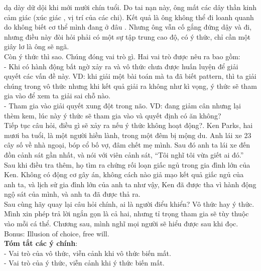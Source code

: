\documentclass{article}
\newcommand\tab[1][1cm]{\hspace*{#1}}
\begin{document}
dạ dày dữ dội khi mới mười chín tuổi. Do tai nạn này, ông mất các dây thần kinh cảm giác (xúc giác
, vị trí của các chi). Kết quả là ông không thể đi loanh quanh do không biết cơ thể mình đang ở đâu
. Nhưng ông vẫn cố gắng đứng dậy và đi, nhưng điều này đòi hỏi phải có một sự tập trung cao độ, 
có ý thức, chỉ cần một giây lơ là ông sẽ ngã.\\
\tab Còn ý thức thì sao. Chúng đóng vai trò gì. Hai vai trò được nêu ra bao gồm:\\
\tab - Khi có hành động bất ngờ xảy ra và vô thức chưa được huấn luyện để giải quyết các vấn đề này.
VD: khi giải một bài toán mà ta đã biết pattern, thì ta giải chúng trong vô thức nhưng khi kết quả 
giải ra không như kì vọng, ý thức sẽ tham gia vào để xem ta giải sai chỗ nào.\\
\tab - Tham gia vào giải quyết xung đột trong não. VD: đang giảm cân nhưng lại thèm kem, lúc này ý
thức sẽ tham gia vào và quyết định có ăn không?\\
\tab Tiếp tục câu hỏi, điều gì sẽ xảy ra nếu ý thức không hoạt động?. Ken Parks, hai mươi ba tuổi, 
là một người hiền lành, trong một đêm bị mộng du. Anh lái xe 23 cây số về nhà ngoại, bóp cổ bố vợ,
đâm chết mẹ mình. Sau đó anh ta lái xe đến đồn cảnh sát gần nhất, và nói với viên cảnh sát, “Tôi nghĩ tôi
vừa giết ai đó.” Sau khi điều tra thêm, họ tìm ra chứng rối loạn giấc ngủ trong gia đình lớn của Ken. 
Không có động cơ gây án, không cách nào giả mạo kết quả giấc ngủ của anh ta, và lịch sử gia đình lớn của 
anh ta như vậy, Ken đã được tha vì hành động ngộ sát của mình, và anh ta đã được thả ra.\\
\tab Sau cùng hãy quay lại câu hỏi chính, ai là người điểu khiển? Vô thức hay ý thức. Mình xin phép trả lời
ngắn gọn là cả hai, nhưng tỉ trọng tham gia sẽ tùy thuộc vào mỗi cá thể. Chương sau, mình nghĩ mọi người sẽ 
hiểu được sau khi đọc.\\
\tab Bonus: Illusion of choice, free will.\\
\tab \textbf{Tóm tắt các ý chính}: \\
\tab - Vai trò của vô thức, viễn cảnh khi vô thức biến mất.\\
\tab - Vai trò của ý thức, viễn cảnh khi ý thức biến mất.\\
\end{document}
